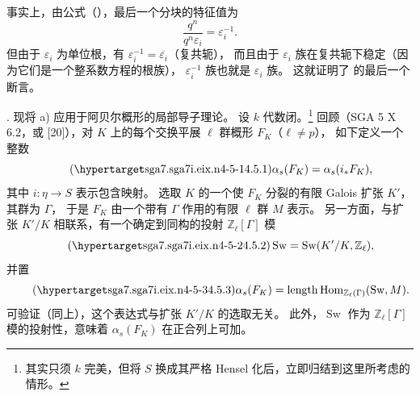 事实上，由公式（），最后一个分块的特征值为
\[
 \frac{q^n}{q^n\varepsilon_i}=\varepsilon_i^{-1}.
\]
但由于 $\varepsilon_i$ 为单位根，有 $\varepsilon_i^{-1}=\overline{\varepsilon_i}$（复共轭），
而且由于 $\varepsilon_i$ 族在复共轭下稳定（因为它们是一个整系数方程的根族），
$\varepsilon_i^{-1}$ 族也就是 $\varepsilon_i$ 族。
这就证明了  的最后一个断言。


%

\medskip
\noindent
{}. 现将  a) 应用于阿贝尔概形的局部导子理论。
设 $k$ 代数闭。\footnote{其实只须 $k$ 完美，但将 $S$ 换成其严格 Hensel 化后，立即归结到这里所考虑的情形。}
回顾（SGA 5 X 6.2，或 [20]），对 $K$ 上的每个交换平展 $\ell$ 群概形 $F_K$（$\ell\neq p$），
如下定义一个整数
\begin{equation}\tag{\SGARefTarget{sga7.sga7i.eix.n4-5-1}{4.5.1}}
 \alpha_s(F_K)=\alpha_s(i_*F_K),
\end{equation}
其中 $i:\eta\longrightarrow S$ 表示包含映射。
选取 $K$ 的一个使 $F_K$ 分裂的有限 Galois 扩张 $K'$，其群为 $\Gamma$，
于是 $F_K$ 由一个带有 $\Gamma$ 作用的有限 $\ell$ 群 $M$ 表示。
另一方面，与扩张 $K'/K$ 相联系，有一个确定到同构的投射 $\mathbb Z_\ell[\Gamma]$ 模
\begin{equation}\tag{\SGARefTarget{sga7.sga7i.eix.n4-5-2}{4.5.2}}
 \operatorname{Sw}=\operatorname{Sw}(K'/K,\mathbb Z_\ell),
\end{equation}
并置
\begin{equation}\tag{\SGARefTarget{sga7.sga7i.eix.n4-5-3}{4.5.3}}
 \alpha_s(F_K)
 =\operatorname{length}
   \operatorname{Hom}_{\mathbb Z_\ell(\Gamma)}(\operatorname{Sw},M).
\end{equation}
可验证（同上），这个表达式与扩张 $K'/K$ 的选取无关。
此外，$\operatorname{Sw}$ 作为 $\mathbb Z_\ell[\Gamma]$ 模的投射性，意味着 $\alpha_s(F_K)$ 在正合列上可加。

